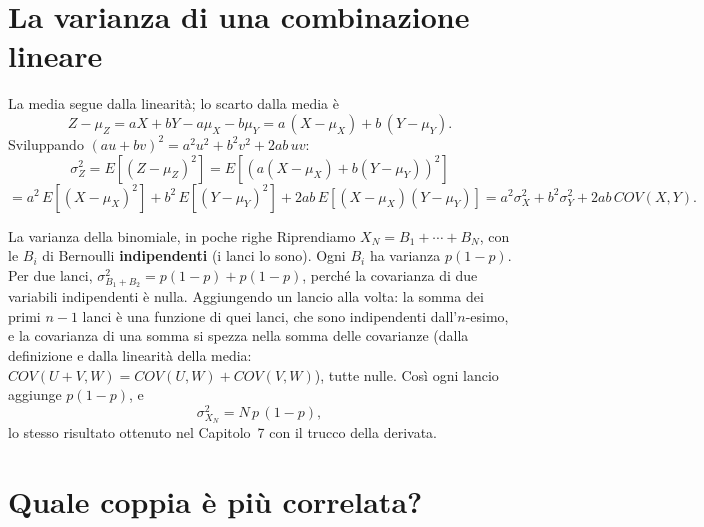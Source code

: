 \section{La varianza di una combinazione lineare}


\begin{dimostrazione}
 La media segue dalla linearità; lo scarto dalla media è
\[ Z - \mu_Z = aX + bY - a\mu_X - b\mu_Y = a\,(X - \mu_X) + b\,(Y - \mu_Y) . \]
 Sviluppando $(a u + b v)^2 = a^2 u^2 + b^2 v^2 + 2ab\,uv$:
\[ \sigma_Z^2 = E\left[(Z - \mu_Z)^2\right] = E\left[ \left( a(X - \mu_X) + b(Y - \mu_Y) \right)^2 \right] \]
\[ = a^2\, E[(X - \mu_X)^2] + b^2\, E[(Y - \mu_Y)^2] + 2ab\, E[(X - \mu_X)(Y - \mu_Y)]
   = a^2 \sigma_X^2 + b^2 \sigma_Y^2 + 2ab\, COV(X, Y) . \]
\end{dimostrazione}

\begin{esempio}{La varianza della binomiale, in poche righe}
Riprendiamo $X_N = B_1 + \cdots + B_N$, con le $B_i$ di Bernoulli \textbf{indipendenti} (i lanci lo sono). Ogni $B_i$
ha varianza $p(1-p)$. Per due lanci, $\sigma_{B_1 + B_2}^2 = p(1-p) + p(1-p)$, perché la covarianza di due variabili
indipendenti è nulla. Aggiungendo un lancio alla volta: la somma dei primi $n - 1$ lanci è una funzione di quei lanci,
che sono indipendenti dall'$n$-esimo, e la covarianza di una somma si spezza nella somma delle covarianze (dalla
definizione e dalla linearità della media: $COV(U + V, W) = COV(U, W) + COV(V, W)$), tutte nulle. Così ogni lancio
aggiunge $p(1-p)$, e
\[ \sigma_{X_N}^2 = N\,p\,(1 - p) , \]
lo stesso risultato ottenuto nel Capitolo~7 con il trucco della derivata.
\end{esempio}

\section{Quale coppia è più correlata?}

